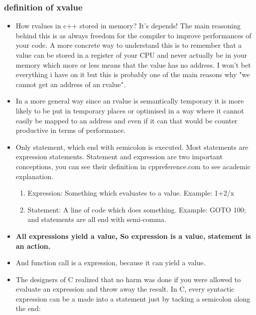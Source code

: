 \documentclass[a4paper,12pt,twoside]{book}
\begin{document}
\subsubsection{definition of xvalue}

\begin{itemize}
		
	\item How rvalues in c++ stored in memory?  It's depends! The main reasoning behind this is as always freedom for the compiler to improve performances of your code. A more concrete way to understand this is to remember that a value can be stored in a register of your CPU and never actually be in your memory which more or less means that the value has no address. I won't bet everything i have on it but this is probably one of the main reasons why "we cannot get an address of an rvalue".

	\item In a more general way since an rvalue is semantically temporary it is more likely to be put in temporary places or optimised in a way where it cannot easily be mapped to an address and even if it can that would be counter productive in terms of performance.

	\item Only statement, which end with semicolon is executed. Most statements are expression statements. Statement and expression are two important conceptions, you can see their definition in cppreference.com to see academic explanation.
	
\begin{enumerate}
\item Expression: Something which evaluates to a value. Example: 1+2/x
\item Statement: A line of code which does something. Example: GOTO 100; and statements are all end with semi-comma.
\end{enumerate}

\item \textbf{All expressions yield a value, So expression is a value, statement is an action.}

\item And function call is a expression, because it can yield a value.

\item The designers of C realized that no harm was done if you were allowed to evaluate an expression and throw away the result. In C, every syntactic expression can be a made into a statement just by tacking a semicolon along the end:


\end{itemize}
\end{document}
